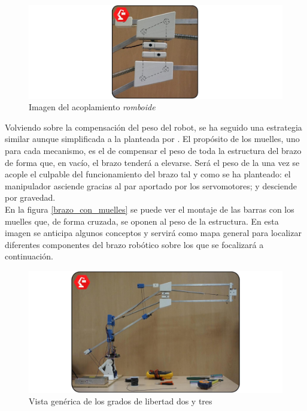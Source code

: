     \begin{figure}[H]
        \centering
        \includegraphics[width=\textwidth]{figuras/Imagenes_Mecanica/acoplamiento_romboide.jpg}
        \caption{Imagen del acoplamiento \textit{romboide}}
        \label{fig:Mecanica:acoplamiento_romboide}
    \end{figure}

    Volviendo sobre la compensación del peso del robot, se ha seguido una estrategia similar aunque simplificada a la planteada por \cite{Rahman_asimple}. El propósito de los muelles, uno para cada mecanismo, es el de compensar el peso de toda la estructura del brazo de forma que, en vacío, el brazo tenderá a elevarse. Será el peso de la  una vez se acople el culpable del funcionamiento del brazo tal y como se ha planteado: el manipulador asciende gracias al par aportado por los servomotores; y desciende por gravedad.
    \\

    En la figura \ref{brazo_con_muelles} se puede ver el montaje de las barras con los muelles que, de forma cruzada, se oponen al peso de la estructura. En esta imagen se anticipa algunos conceptos y servirá como mapa general para localizar diferentes componentes del brazo robótico sobre los que se focalizará a continuación.

    \begin{figure}[H]
        \centering
        \includegraphics[width=\textwidth]{figuras/Imagenes_Mecanica/foto_brazo_10.jpg}
        \caption{Vista genérica de los grados de libertad dos y tres}
        \label{fig:Mecanica:brazo_con_muelles}
    \end{figure}


